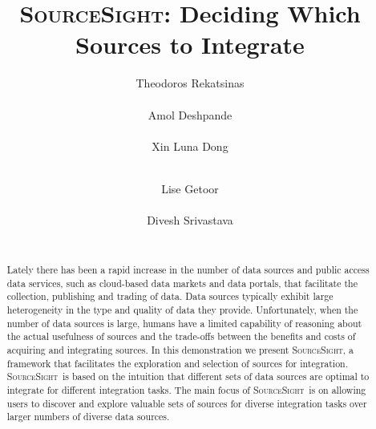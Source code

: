 \documentclass{vldb}
\newcommand\system{\textsc{SourceSight}}
\begin{document}

\title{{\LARGE \system}: Deciding Which Sources to Integrate}


\author{
\alignauthor
Theodoros Rekatsinas\\
       \\
\alignauthor
Amol Deshpande\\
       \\
\alignauthor 
Xin Luna Dong\\
       \\
\and  %
\alignauthor 
Lise Getoor\\
       \\
\alignauthor Divesh Srivastava\\
       \\
}

\maketitle

\begin{abstract}
Lately there has been a rapid increase in the number of data sources and public access data services, such as cloud-based data markets and data portals, that facilitate the collection, publishing and trading of data. Data sources typically exhibit large heterogeneity in the type and quality of data they provide. Unfortunately, when the number of data sources is large, humans have a limited capability of reasoning about the actual usefulness of sources and the trade-offs between the benefits and costs of acquiring and integrating sources. In this demonstration we present \system, a framework that facilitates the exploration and selection of sources for integration. \system~is based on the intuition that different sets of data sources are optimal to integrate for different integration tasks. The main focus of \system~is on allowing users to discover and explore valuable sets of sources for diverse integration tasks over larger numbers of diverse data sources.
\end{abstract}
\end{document}
